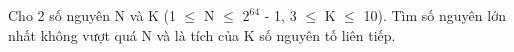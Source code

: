 Cho 2 số nguyên N và K (1  $\le$  N  $\le$  $2^{64}$   - 1, 3  $\le$  K  $\le$  10). Tìm số nguyên lớn nhất không vượt quá N và là tích của K số nguyên tố liên tiếp.
